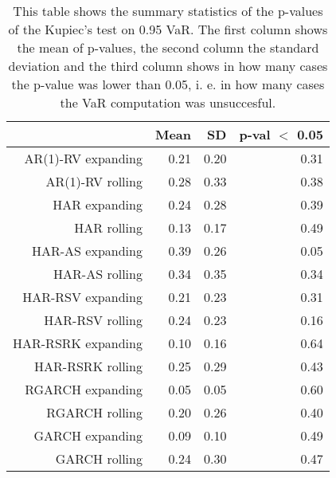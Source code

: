 \begin{table}[ht]
\centering
\begin{tabular}{rrrr}
  \hline
 & Mean & SD & p-val $<$ 0.05 \\ 
  \hline
AR(1)-RV expanding & 0.21 & 0.20 & 0.31 \\ 
  AR(1)-RV rolling & 0.28 & 0.33 & 0.38 \\ 
  HAR expanding & 0.24 & 0.28 & 0.39 \\ 
  HAR rolling & 0.13 & 0.17 & 0.49 \\ 
  HAR-AS expanding & 0.39 & 0.26 & 0.05 \\ 
  HAR-AS rolling & 0.34 & 0.35 & 0.34 \\ 
  HAR-RSV expanding & 0.21 & 0.23 & 0.31 \\ 
  HAR-RSV rolling & 0.24 & 0.23 & 0.16 \\ 
  HAR-RSRK expanding & 0.10 & 0.16 & 0.64 \\ 
  HAR-RSRK rolling & 0.25 & 0.29 & 0.43 \\ 
  RGARCH expanding & 0.05 & 0.05 & 0.60 \\ 
  RGARCH rolling & 0.20 & 0.26 & 0.40 \\ 
  GARCH expanding & 0.09 & 0.10 & 0.49 \\ 
  GARCH rolling & 0.24 & 0.30 & 0.47 \\ 
   \hline
\end{tabular}
\caption[Kupiec's test p-values summary, alpha =0.95]{This table shows the summary statistics of the p-values of the Kupiec's test on 0.95 VaR. 
            The first column shows the mean of p-values, the second column the standard deviation 
            and the third column shows in how many cases the p-value was lower than 0.05, i. e. in how many cases the VaR computation was unsuccesful.} 
\label{Table:Kupiec_test_summary_0.95}
\end{table}

